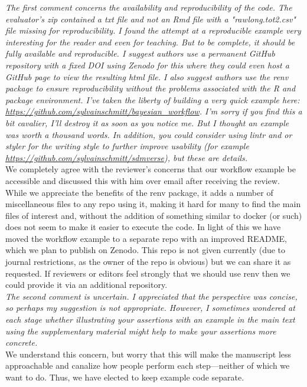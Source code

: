 \documentclass[11pt,a4paper]{article}
\begin{document}
\emph{The first comment concerns the availability and reproducibility of the code. The evaluator's zip contained a txt file and not an Rmd file with a "rawlong.tot2.csv" file missing for reproducibility. I found the attempt at a reproducible example very interesting for the reader and even for teaching. But to be complete, it should be fully available and reproducible. I suggest authors use a permanent GitHub repository with a fixed DOI using Zenodo for this where they could even host a GitHub page to view the resulting html file. I also suggest authors use the renv package to ensure reproducibility without the problems associated with the R and package environment. I've taken the liberty of building a very quick example here: \url{https://github.com/sylvainschmitt/bayesian_workflow}. I'm sorry if you find this a bit cavalier, I'll destroy it as soon as you notice me. But I thought an example was worth a thousand words. In addition, you could consider using lintr and or styler for the writing style to further improve usability (for example \url{https://github.com/sylvainschmitt/sdmverse}), but these are details.}\\

We completely agree with the reviewer's concerns that our workflow example be accessible and discussed this with him over email after receiving the review. While we appreciate the benefits of the renv package, it adds a number of miscellaneous files to any repo using it, making it hard for many to find the main files of interest and, without the addition of something similar to docker (or such) does not seem to make it easier to execute the code. In light of this we have moved the workflow example to a separate repo with an improved README, which we plan to publish on Zenodo. This repo is not given currently (due to journal restrictions, as the owner of the repo is obvious) but we can share it as requested. If reviewers or editors feel strongly that we should use renv then we could provide it via an additional repository.\\

\emph{The second comment is uncertain. I appreciated that the perspective was concise, so perhaps my suggestion is not appropriate. However, I sometimes wondered at each stage whether illustrating your assertions with an example in the main text using the supplementary material might help to make your assertions more concrete.}\\

We understand this concern, but worry that this will make the manuscript less approachable and canalize how people perform each step---neither of which we want to do. Thus, we have elected to keep example code separate.\\
\end{document}
